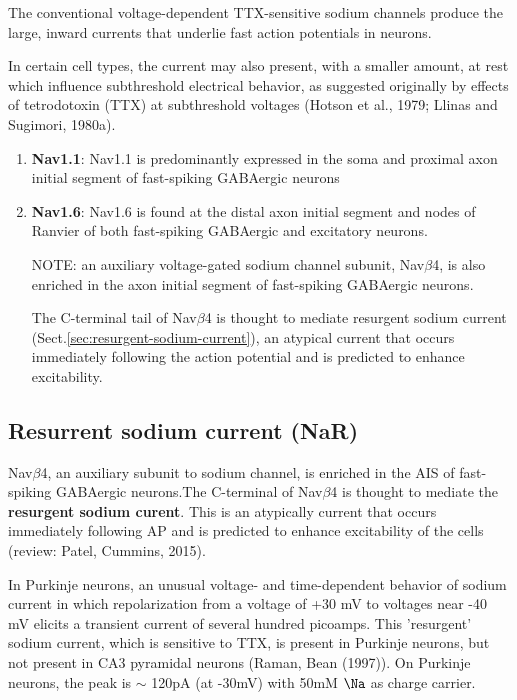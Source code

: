 The conventional voltage-dependent TTX-sensitive sodium channels produce the
large, inward currents that underlie fast action potentials in neurons.

In certain cell types, the current may also present, with a smaller amount, at
rest which influence subthreshold electrical behavior, as suggested originally
by effects of tetrodotoxin (TTX) at subthreshold voltages (Hotson et al., 1979;
Llinas and Sugimori, 1980a).

\begin{enumerate}
  
  \item {\bf Nav1.1}:   Nav1.1 is predominantly expressed in the soma and
  proximal axon initial segment of fast-spiking GABAergic neurons
  
  
  \item {\bf Nav1.6}: Nav1.6 is found at the distal axon initial segment and
  nodes of Ranvier of both fast-spiking GABAergic and excitatory neurons.
  
 NOTE: an auxiliary voltage-gated sodium channel subunit, Nav$\beta$4, is also
 enriched in the axon initial segment of fast-spiking GABAergic neurons.
 
 The C-terminal tail of Nav$\beta$4 is thought to mediate resurgent sodium
 current (Sect.\ref{sec:resurgent-sodium-current}), an atypical current that
 occurs immediately following the action potential and is predicted to enhance
 excitability.
 
\end{enumerate}

\subsection{Resurrent sodium current (NaR)}
\label{sec:NaR-current}
\label{sec:resurgent-sodium-current}

Nav$\beta$4, an auxiliary subunit to sodium channel, is enriched in the AIS of
fast-spiking GABAergic neurons.The C-terminal of Nav$\beta$4 is thought to
mediate the {\bf resurgent sodium curent}. This is an atypically current that
occurs immediately following AP and is predicted to enhance excitability of the
cells (review: Patel, Cummins, 2015).

In Purkinje neurons, an unusual voltage- and time-dependent behavior of sodium
current in which repolarization from a voltage of +30 mV to voltages near -40 mV
elicits a transient current of several hundred picoamps. This 'resurgent' sodium
current, which is sensitive to TTX, is present in Purkinje neurons, but not
present in CA3 pyramidal neurons (Raman, Bean (1997)). On Purkinje neurons,
the peak is $\sim$ 120pA (at -30mV) with 50mM $\Na$ as charge carrier.

